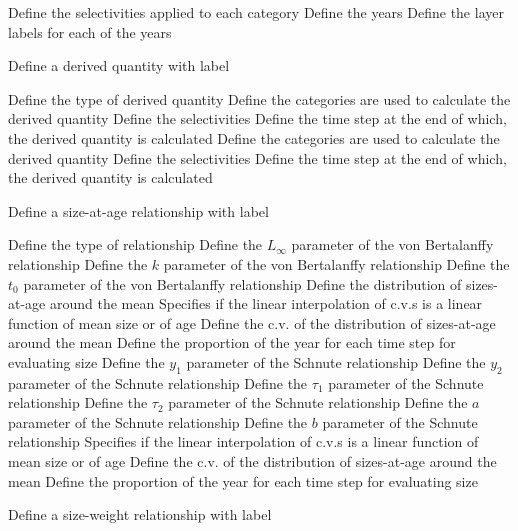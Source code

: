  {Define the selectivities applied to each category}
 {Define the years}
 {Define the layer labels for each of the years}
\par {} {Define a derived quantity with label}\par \par
{} {Define the type of derived quantity}
 {Define the categories are used to calculate the derived quantity}
 {Define the selectivities}
 {Define the time step at the end of which, the derived quantity is calculated}
 {Define the categories are used to calculate the derived quantity}
 {Define the selectivities}
 {Define the time step at the end of which, the derived quantity is calculated}
\par {} {Define a size-at-age relationship with label}\par \par
{} {Define the type of relationship}
 {Define the $L_\infty$ parameter of the von Bertalanffy relationship}
 {Define the $k$ parameter of the von Bertalanffy relationship}
 {Define the $t_0$ parameter of the von Bertalanffy relationship}
 {Define the distribution of sizes-at-age around the mean}
 {Specifies if the linear interpolation of c.v.s is a linear function of mean size or of age}
 {Define the c.v. of the distribution of sizes-at-age around the mean}
 {Define the proportion of the year for each time step for evaluating size}
 {Define the $y_1$ parameter of the Schnute relationship}
 {Define the $y_2$ parameter of the Schnute relationship}
 {Define the $\tau_1$ parameter of the Schnute relationship}
 {Define the $\tau_2$ parameter of the Schnute relationship}
 {Define the $a$ parameter of the Schnute relationship}
 {Define the $b$ parameter of the Schnute relationship}
 {Specifies if the linear interpolation of c.v.s is a linear function of mean size or of age}
 {Define the c.v. of the distribution of sizes-at-age around the mean}
 {Define the proportion of the year for each time step for evaluating size}
\par {} {Define a size-weight relationship with label}\par \par
